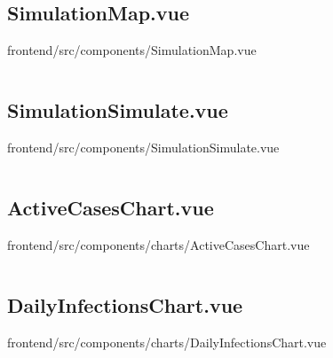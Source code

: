 \inputminted[linenos,breaklines,tabsize=2]{vue}{/Users/Henry/Desktop/NEAComputerScience/frontend/src/components/SimulationDetailsModal.vue}

\makeatletter
\subsection*{SimulationMap.vue}
frontend/src/components/SimulationMap.vue
\def\@currentlabelname{SimulationMap.vue}
\label{code:frontend:src:components:SimulationMap.vue}
\makeatother

\inputminted[linenos,breaklines,tabsize=2]{vue}{/Users/Henry/Desktop/NEAComputerScience/frontend/src/components/SimulationMap.vue}

\makeatletter
\subsection*{SimulationSimulate.vue}
frontend/src/components/SimulationSimulate.vue
\def\@currentlabelname{SimulationSimulate.vue}
\label{code:frontend:src:components:SimulationSimulate.vue}
\makeatother

\inputminted[linenos,breaklines,tabsize=2]{vue}{/Users/Henry/Desktop/NEAComputerScience/frontend/src/components/SimulationSimulate.vue}

\makeatletter
\subsection*{ActiveCasesChart.vue}
frontend/src/components/charts/ActiveCasesChart.vue
\def\@currentlabelname{ActiveCasesChart.vue}
\label{code:frontend:src:components:charts:ActiveCasesChart.vue}
\makeatother

\inputminted[linenos,breaklines,tabsize=2]{vue}{/Users/Henry/Desktop/NEAComputerScience/frontend/src/components/charts/ActiveCasesChart.vue}

\makeatletter
\subsection*{DailyInfectionsChart.vue}
frontend/src/components/charts/DailyInfectionsChart.vue
\def\@currentlabelname{DailyInfectionsChart.vue}
\label{code:frontend:src:components:charts:DailyInfectionsChart.vue}
\makeatother

\inputminted[linenos,breaklines,tabsize=2]{vue}{/Users/Henry/Desktop/NEAComputerScience/frontend/src/components/charts/DailyInfectionsChart.vue}

